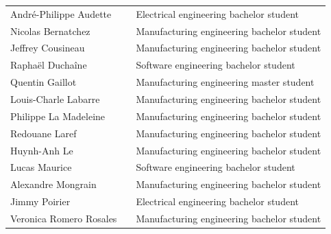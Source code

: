 \documentclass[runningheads,a4paper]{llncs}
\begin{document}
\begin{tabular}{lll}
   
André-Philippe Audette &    & 	Electrical engineering bachelor student \\
Nicolas Bernatchez &    & 		Manufacturing engineering bachelor student \\
Jeffrey Cousineau &    & 		Manufacturing engineering bachelor student \\
Raphaël Duchaîne &    & 		Software engineering bachelor student \\
Quentin Gaillot &    & 			Manufacturing engineering master student \\
Louis-Charle Labarre &    & 	Manufacturing engineering bachelor student \\ 
Philippe La Madeleine &    & 	Manufacturing engineering bachelor student \\ 
Redouane Laref &    & 			Manufacturing engineering bachelor student \\
Huynh-Anh Le &    & 			Manufacturing engineering bachelor student \\
Lucas Maurice &    & 			Software engineering bachelor student \\
Alexandre Mongrain  &    & 		Manufacturing engineering bachelor student \\
Jimmy Poirier &    & 			Electrical engineering bachelor student \\
Veronica Romero Rosales  &   & Manufacturing engineering bachelor student \\

\end{tabular}
\end{document}
